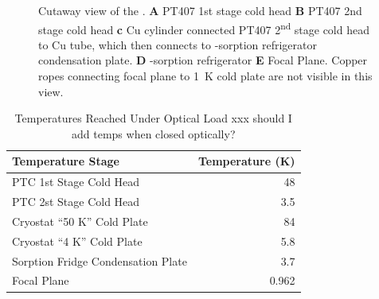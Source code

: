 \begin{figure}[t]
\caption{Cutaway view of the \Imager. \textbf{A} PT407 1st stage cold head \textbf{B} PT407 2nd stage cold head \textbf{c} Cu cylinder connected PT407 2\textsuperscript{nd} stage cold head to Cu tube, which then connects to -sorption refrigerator condensation plate. \textbf{D} -sorption refrigerator \textbf{E} Focal Plane. Copper ropes connecting focal plane to 1~K cold plate are not visible in this view.}
\label{fig:cryo-cutaway}
\end{figure}

\begin{table}[t]
\centering
\caption{Temperatures Reached Under Optical Load xxx should I add temps when closed optically?}
\label{tab:temp-optical-load}
\begin{tabular}{l r}
\toprule
Temperature Stage &  Temperature (K)\\
\midrule
PTC 1st Stage Cold Head 			& 48 \\
PTC 2st Stage Cold Head 			& 3.5 \\
Cryostat ``50 K'' Cold Plate 		& 84 \\
Cryostat ``4 K'' Cold Plate 			& 5.8 \\
Sorption Fridge Condensation Plate 	& 3.7 \\
Focal Plane 						& 0.962 \\
\bottomrule
\end{tabular}
\end{table}

